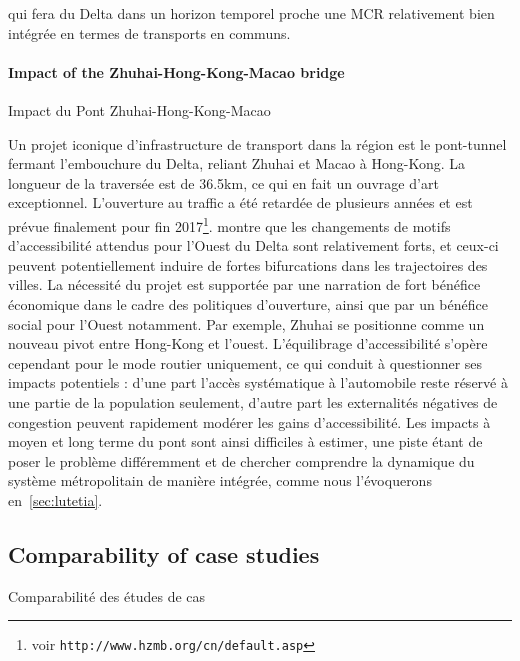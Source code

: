 {qui fera du Delta dans un horizon temporel proche une MCR relativement bien intégrée en termes de transports en communs.
}


\paragraph{Impact of the Zhuhai-Hong-Kong-Macao bridge}{Impact du Pont Zhuhai-Hong-Kong-Macao}

Un projet iconique d'infrastructure de transport dans la région est le pont-tunnel fermant l'embouchure du Delta, reliant Zhuhai et Macao à Hong-Kong. La longueur de la traversée est de 36.5km, ce qui en fait un ouvrage d'art exceptionnel. L'ouverture au traffic a été retardée de plusieurs années et est prévue finalement pour fin 2017\footnote{voir \texttt{http://www.hzmb.org/cn/default.asp}}. \cite{zhou2016medium} montre que les changements de motifs d'accessibilité attendus pour l'Ouest du Delta sont relativement forts, et ceux-ci peuvent potentiellement induire de fortes bifurcations dans les trajectoires des villes. La nécessité du projet est supportée par une narration de fort bénéfice économique dans le cadre des politiques d'ouverture, ainsi que par un bénéfice social pour l'Ouest notamment. Par exemple, Zhuhai se positionne comme un nouveau pivot entre Hong-Kong et l'ouest. L'équilibrage d'accessibilité s'opère cependant pour le mode routier uniquement, ce qui conduit à questionner ses impacts potentiels : d'une part l'accès systématique à l'automobile reste réservé à une partie de la population seulement, d'autre part les externalités négatives de congestion peuvent rapidement modérer les gains d'accessibilité. Les impacts à moyen et long terme du pont sont ainsi difficiles à estimer, une piste étant de poser le problème différemment et de chercher comprendre la dynamique du système métropolitain de manière intégrée, comme nous l'évoquerons en~\ref{sec:lutetia}.







\subsection{Comparability of case studies}{Comparabilité des études de cas}


